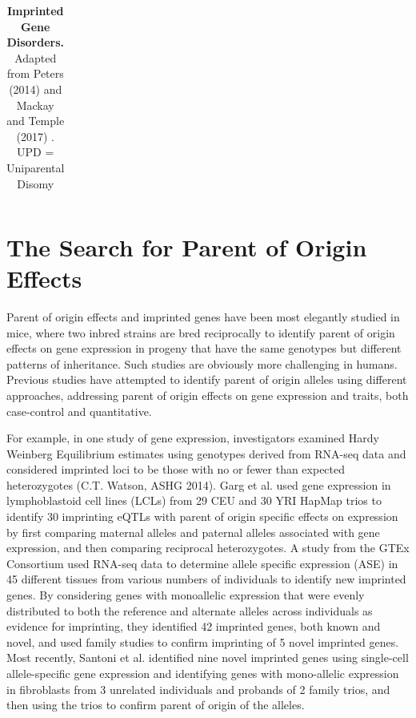 \begin{table}
\begin{adjustbox}{width=1\textwidth}
\begin{tabular}{@{}p{3cm}p{2cm}p{7cm}p{7cm}@{}}
\bottomrule
\end{tabular}
\end{adjustbox}
\caption[Imprinted Gene Disorders.]{\textbf{Imprinted Gene Disorders.} Adapted from Peters (2014) and Mackay and Temple (2017) \cite{Peters2014,Mackay:2017kn}. UPD = Uniparental Disomy}
\label{tab:imprinteddisease}
\end{table}



\section{The Search for Parent of Origin Effects}


Parent of origin effects and imprinted genes have been most elegantly studied in mice, where two inbred strains are bred reciprocally to identify parent of origin effects on gene expression in progeny that have the same genotypes but different patterns of inheritance\cite{Babak2012}. Such studies are obviously more challenging in humans. Previous studies have attempted to identify parent of origin alleles using different approaches, addressing parent of origin effects on gene expression and traits, both case-control and quantitative.

For example, in one study of gene expression, investigators examined Hardy Weinberg Equilibrium estimates using genotypes derived from RNA-seq data and considered imprinted loci to be those with no or fewer than expected heterozygotes (C.T. Watson, ASHG 2014). Garg et al. used gene expression in lymphoblastoid cell lines (LCLs) from 29 CEU and 30 YRI HapMap trios to identify 30 imprinting eQTLs with parent of origin specific effects on expression by first comparing maternal alleles and paternal alleles associated with gene expression, and then comparing reciprocal heterozygotes\cite{Garg2012a}. A study from the GTEx Consortium used RNA-seq data to determine allele specific expression (ASE) in 45 different tissues from various numbers of individuals to identify new imprinted genes\cite{Baran:2015cx}. By considering genes with monoallelic expression that were evenly distributed to both the reference and alternate alleles across individuals as evidence for imprinting, they identified 42 imprinted genes, both known and novel, and used family studies to confirm imprinting of 5 novel imprinted genes. Most recently, Santoni et al. identified nine novel imprinted genes using single-cell allele-specific gene expression and identifying genes with mono-allelic expression in fibroblasts from 3 unrelated individuals and probands of 2 family trios, and then using the trios to confirm parent of origin of the alleles\cite{Santoni:2017hu}.

